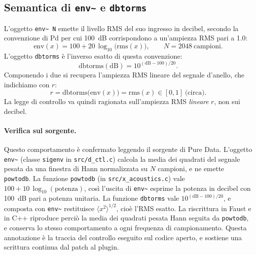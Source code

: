 \documentclass[11pt,a4paper]{article}
\begin{document}
\subsection{Semantica di \texttt{env\textasciitilde{}} e \texttt{dbtorms}}
L'oggetto \texttt{env\textasciitilde{} N} emette il livello RMS del suo ingresso in decibel, secondo la convenzione di Pd per cui \SI{100}{\deci\bel} corrispondono a un'ampiezza RMS pari a \num{1.0}:
\begin{equation}
\text{env}(x) = 100 + 20\,\log_{10}\!\big(\mathrm{rms}(x)\big),
\qquad N = 2048~\text{campioni}.
\end{equation}
L'oggetto \texttt{dbtorms} è l'inverso esatto di questa convenzione:
\begin{equation}
\mathrm{dbtorms}(\text{dB}) = 10^{(\text{dB} - 100)/20}.
\end{equation}
Componendo i due si recupera l'ampiezza RMS lineare del segnale d'anello, che indichiamo con $r$:
\begin{equation}
r = \mathrm{dbtorms}\big(\text{env}(x)\big) = \mathrm{rms}(x) \in [0, 1]\ \text{(circa)}.
\end{equation}
La legge di controllo va quindi ragionata sull'ampiezza RMS \emph{lineare} $r$, non sui decibel.

\paragraph{Verifica sul sorgente.}
Questo comportamento è confermato leggendo il sorgente di Pure Data.
L'oggetto \texttt{env\textasciitilde{}} (classe \texttt{sigenv} in \texttt{src/d\_ctl.c}) calcola la media dei quadrati del segnale pesata da una finestra di Hann normalizzata su $N$ campioni, e ne emette \texttt{powtodb}.
La funzione \texttt{powtodb} (in \texttt{src/x\_acoustics.c}) vale $100 + 10\,\log_{10}(\text{potenza})$, così l'uscita di \texttt{env\textasciitilde{}} esprime la potenza in decibel con \SI{100}{\deci\bel} pari a potenza unitaria.
La funzione \texttt{dbtorms} vale $10^{(\text{dB}-100)/20}$, e composta con \texttt{env\textasciitilde{}} restituisce $\langle x^2\rangle^{1/2}$, cioè l'RMS esatto.
La riscrittura in Faust e in C++ riproduce perciò la media dei quadrati pesata Hann seguita da \texttt{powtodb}, e conserva lo stesso comportamento a ogni frequenza di campionamento.
Questa annotazione è la traccia del controllo eseguito sul codice aperto, e sostiene una scrittura continua dal patch al plugin.
\end{document}
